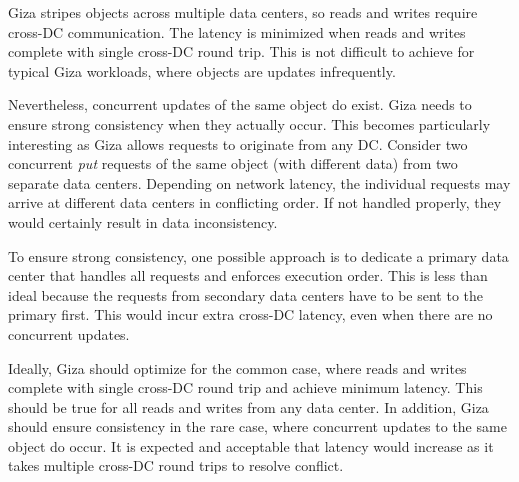 Giza stripes objects across multiple data centers, so reads and writes require cross-DC communication. The latency is minimized when reads and writes complete with single cross-DC round trip. This is not difficult to achieve for typical Giza workloads, where objects are updates infrequently.

Nevertheless, concurrent updates of the same object do exist. Giza needs to ensure strong consistency when they actually occur. This becomes particularly interesting as Giza allows requests to originate from any DC. Consider two concurrent {\em put} requests of the same object (with different data) from two separate data centers. Depending on network latency, the individual requests may arrive at different data centers in conflicting order. If not handled properly, they would certainly result in data inconsistency. 

To ensure strong consistency, one possible approach is to dedicate a primary data center that handles all requests and enforces execution order. This is less than ideal because the requests from secondary data centers have to be sent to the primary first. This would incur extra cross-DC latency, even when there are no concurrent updates.

Ideally, Giza should optimize for the common case, where reads and writes complete with single cross-DC round trip and achieve minimum latency. This should be true for all reads and writes from any data center. In addition, Giza should ensure consistency in the rare case, where concurrent updates to the same object do occur. It is expected and acceptable that latency would increase as it takes multiple cross-DC round trips to resolve conflict.


